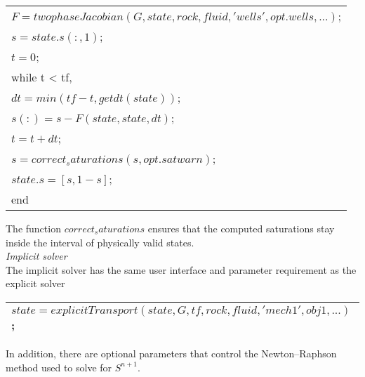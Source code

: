 \documentclass[a4paper,10pt]{report}
\begin{document}
\begin{table}[!ht]
\centering
\begin{tabular}{ |l |} 
\hline
$F = twophaseJacobian(G, state, rock, fluid, 'wells', opt.wells, ... )$;\\
$s = state.s(:,1)$;\\
$t = 0$;\\
while t < tf,\\
\hspace{0.5cm}$dt = min(tf−t, getdt(state))$;\\
\hspace{0.5cm}$s (:) = s − F(state, state, dt)$;\\
\hspace{0.5cm}$t = t + dt$;\\
\hspace{0.5cm} $s= correct_saturations(s, opt.satwarn)$;\\
\hspace{0.5cm}$state.s = [s, 1−s]$;\\
end\\
 \hline
\end{tabular}
\label{table:etransp}
\end{table} 

The function $correct_saturations$ ensures that the computed saturations
stay inside the interval of physically valid states. \\
\emph{Implicit solver}\\
The implicit solver has the same user interface and parameter requirement as
the explicit solver
\begin{table}[!ht]
\centering
\begin{tabular}{ |l |} 
\hline
$state = explicitTransport(state, G, tf, rock, fluid, 'mech1', obj1, ...)$;\\
 \hline
\end{tabular}
\label{table:etransp}
\end{table} 
In addition, there are optional parameters that control the Newton–Raphson
method used to solve for $S ^{n+1}$. 
\end{document}
